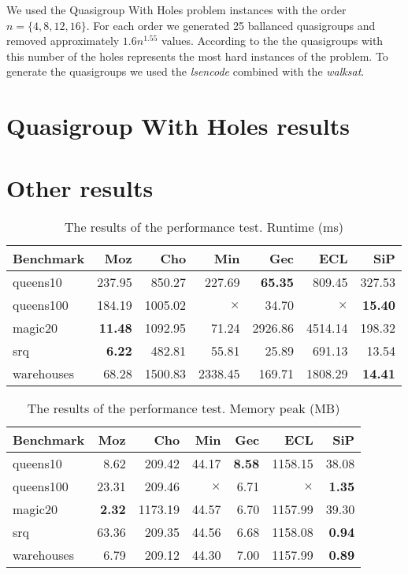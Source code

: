 We used the Quasigroup With Holes problem instances with the order $n = \{4,8,12,16\}$. For
each order we generated 25 ballanced quasigroups and removed approximately
 $1.6 n^{1.55}$ values. According to the \cite{Achlioptas00generatingsatisfiable} the quasigroups with this
 number of the holes represents the most hard instances of the problem. To generate the quasigroups we used the
 {\em lsencode} combined with the {\em walksat}.
 
\section{Quasigroup With Holes results}

\section{Other results}  

\begin{table}
\caption{\label{results:performance:runtime}The results of the performance test. Runtime (ms)}
\begin{center}
\begin{tabular}{lrrrrrr}
\hline Benchmark & Moz & Cho & Min & Gec & ECL & SiP \\
\hline queens10 & 237.95 & 850.27 & 227.69 & {\bf 65.35} & 809.45 & 327.53 \\
	queens100 & 184.19 & 1005.02 & $\times$ & 34.70 & $\times$ & {\bf 15.40} \\
	magic20 & {\bf 11.48} & 1092.95 & 71.24 & 2926.86 & 4514.14 & 198.32 \\
	srq & {\bf 6.22} & 482.81 & 55.81 & 25.89 & 691.13 & 13.54 \\
	warehouses & 68.28 & 1500.83 & 2338.45 & 169.71 & 1808.29 & {\bf 14.41} \\  
\hline 
\end{tabular}
\end{center}
\end{table}

\begin{table}
\caption{\label{results:performance:runtime}The results of the performance test. Memory peak (MB)}
\begin{center}
\begin{tabular}{lrrrrrr}
\hline Benchmark & Moz & Cho & Min & Gec & ECL & SiP \\
\hline 	queens10 & 8.62 & 209.42 & 44.17 & {\bf 8.58} & 1158.15 & 38.08 \\
				queens100 & 23.31 & 209.46 & $\times$ & 6.71 & $\times$ & {\bf 1.35} \\
				magic20 & {\bf 2.32} & 1173.19 & 44.57 & 6.70 & 1157.99 & 39.30 \\
				srq & 63.36 & 209.35 & 44.56 & 6.68 & 1158.08 & {\bf 0.94} \\
				warehouses & 6.79  & 209.12 & 44.30 & 7.00 & 1157.99 & {\bf 0.89} \\
\hline
\end{tabular}
\end{center}
\end{table}

